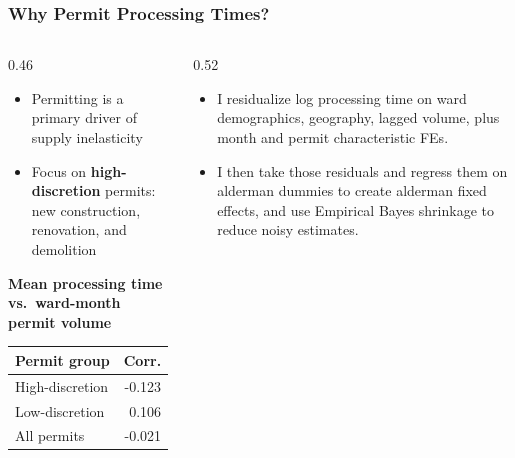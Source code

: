 \begin{frame}[label=permit-stats-main]
    \frametitle{Why Permit Processing Times?}
    \begin{columns}[T]
    \begin{column}{0.46\textwidth}
        \begin{itemize}[itemsep=0.2em,topsep=0.25em]
            \item Permitting is a primary driver of supply inelasticity \citep{soltas_how_2026}
            \item Focus on \textbf{high-discretion} permits: new construction, renovation, and demolition
        \end{itemize}
        \vspace{0.65em}
        {\scriptsize
        \centering
        \textbf{Mean processing time vs.\ ward-month permit volume}
        \vspace{0.15em}

        \setlength{\tabcolsep}{3pt}
        \renewcommand{\arraystretch}{1.05}
        \begin{tabular}{lr}
            \toprule
            Permit group & Corr. \\
            \midrule
            High-discretion & -0.123 \\
            Low-discretion & 0.106 \\
            All permits & -0.021 \\
            \bottomrule
        \end{tabular}
        \par}
    \end{column}
    \begin{column}{0.52\textwidth}
        \begin{itemize}[itemsep=0.45em,topsep=0.25em]
            \item I residualize log processing time on ward demographics, geography, lagged volume, plus month and permit characteristic FEs.
            \item I then take those residuals and regress them on alderman dummies to create alderman fixed effects, and use Empirical Bayes shrinkage to reduce noisy estimates.
        \end{itemize}
    \end{column}
    \end{columns}
\end{frame}

